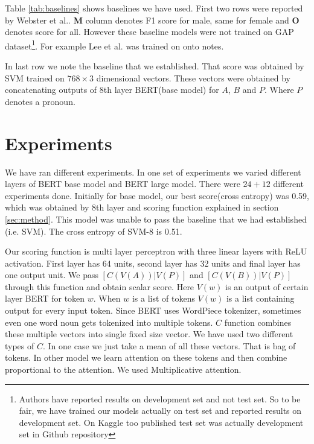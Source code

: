 \documentclass[11pt,a4paper]{article}
\begin{document}
Table \ref{tab:baselines} shows baselines we have used. First two rows were reported by Webster et al.. \textbf{M} column denotes F1 score for male, same for female and \textbf{O} denotes score for all. However these baseline models were not trained on GAP dataset\footnote{Authors have reported results on development set and not test set. So to be fair, we have trained our models actually on test set and reported results on development set. On Kaggle too published test set was actually development set in Github repository}. For example Lee et al.  was trained on onto notes. 

In last row we note the baseline that we established. That score was obtained by SVM trained on $768 \times 3$ dimensional vectors. These vectors were obtained by concatenating outputs of 8th layer BERT(base model) for $A$, $B$ and $P$. Where $P$ denotes a pronoun.  

\section{Experiments}
\label{sec:experiments}

We have ran different experiments. In one set of experiments we varied different layers of BERT base model and BERT large model. There were $24 + 12$ different experiments done. Initially for base model, our best score(cross entropy) was 0.59, which was obtained by 8th layer and scoring function explained in section \ref{sec:method}. This model was unable to pass the baseline that we had established (i.e. SVM). The cross entropy of SVM-8 is 0.51.

Our scoring function is multi layer perceptron with three linear layers with ReLU activation. First layer has 64 units, second layer has 32 units and final layer has one output unit. We pass $[C(V(A))|V(P)]$ and $[C(V(B))|V(P)]$ through this function and obtain scalar score. Here $V(w)$ is an output of certain layer BERT for token $w$. When $w$ is a list of tokens $V(w)$ is a list containing output for every input token. Since BERT uses WordPiece tokenizer, sometimes even one word noun gets tokenized into multiple tokens. $C$ function combines these multiple vectors into single fixed size vector. We have used two different types of $C$. In one case we just take a mean of all these vectors. That is bag of tokens. In other model we learn attention on these tokens and then combine proportional to the attention. We used Multiplicative attention. 
\end{document}
